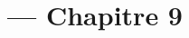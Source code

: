 
\title{\TSwiftTitle{} --- Chapitre 9}

\newcommand{\TSwiftRoot}[0]{../..} %



\maketitle

\tableofcontents




